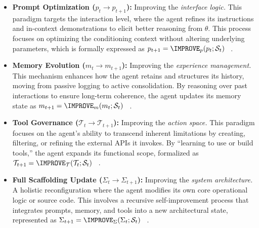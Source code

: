 \begin{itemize}
    \item \textbf{Prompt Optimization ($p_{t} \rightarrow p_{t+1}$):} Improving the \textit{interface logic.} This paradigm targets the interaction level, where the agent refines its instructions and in-context demonstrations to elicit better reasoning from $\theta$. This process focuses on optimizing the conditioning context without altering underlying parameters, which is formally expressed as $p_{t+1}=\IMPROVE_{p}(p_t; \mathcal{S}_t)$ ~\citep{yuksekgonul2024textgradautomaticdifferentiationtext, guo2025evopromptconnectingllmsevolutionary, fernando2024promptbreeder, zhou2022large}.

    \item \textbf{Memory Evolution ($m_{t} \rightarrow m_{t+1}$):} Improving the \textit{experience management.} This mechanism enhances how the agent retains and structures its history, moving from passive logging to active consolidation. By reasoning over past interactions to ensure long-term coherence, the agent updates its memory state as $m_{t+1}=\IMPROVE_{m}(m_t; \mathcal{S}_t)$ ~\citep{chhikara2025mem0buildingproductionreadyai, wang2024agentworkflowmemory, zhang2025memgenweavinggenerativelatent, zhong2024memorybank}.

    \item \textbf{Tool Governance ($\mathcal{T}_{t} \rightarrow \mathcal{T}_{t+1}$):} Improving the \textit{action space.} This paradigm focuses on the agent's ability to transcend inherent limitations by creating, filtering, or refining the external APIs it invokes. By ``learning to use or build tools,'' the agent expands its functional scope, formalized as $\mathcal{T}_{t+1}=\IMPROVE_{\mathcal{T}}(\mathcal{T}_t; \mathcal{S}_t)$ ~\citep{haque2025advancedtoollearningselection, wang2025toolgenunifiedtoolretrieval, dong2025tool, zhang2025agentorchestraorchestratinghierarchicalmultiagent}.

    \item \textbf{Full Scaffolding Update ($\Sigma_{t} \rightarrow \Sigma_{t+1}$):} Improving the \textit{system architecture.} A holistic reconfiguration where the agent modifies its own core operational logic or source code. This involves a recursive self-improvement process that integrates prompts, memory, and tools into a new architectural state, represented as $\Sigma_{t+1}=\IMPROVE_{\Sigma}(\Sigma_t; \mathcal{S}_t)$ ~\citep{hu2025automateddesignagenticsystems, zhang2025darwingodelmachineopenended, novikov2025alphaevolvecodingagentscientific, xia2025livesweagentsoftwareengineeringagents}.
\end{itemize}


